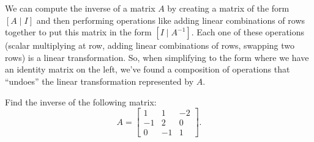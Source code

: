 We can compute the inverse of a matrix $A$ by creating a matrix of the form $[A \mid I]$ and then performing operations like adding linear combinations of rows together to put this matrix in the form $[I \mid A^{-1}]$.
Each one of these operations (scalar multiplying at row, adding linear combinations of rows, swapping two rows) is a linear transformation.
So, when simplifying to the form where we have an identity matrix on the left, we've found a composition of operations that ``undoes'' the linear transformation represented by $A$.

\begin{example}
	Find the inverse of the following matrix:
	\begin{equation*}
		A = \begin{bmatrix}
			1 & 1 & -2 \\
			-1 & 2 & 0 \\
			0 & -1 & 1
		\end{bmatrix}.
	\end{equation*}
\end{example}
